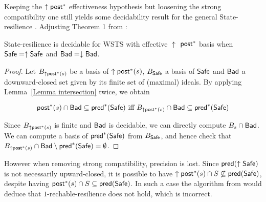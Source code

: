 Keeping the $\uparrow \textsf{post}^*$ effectiveness hypothesis but loosening the strong compatibility one still yields some decidability result for the general {\sc State-resilience }. Adjusting Theorem 1 from \cite{DBLP:journals/corr/abs-2108-00889}:


\begin{theorem}\label{post srp}
{\sc State-resilience} is decidable for 
 WSTS with effective 
$\uparrow$ $\textsf{post}^*$ basis
when
$\textsf{Safe}=\uparrow \textsf{Safe}$
and $\textsf{Bad}=\downarrow \textsf{Bad}$.
\end{theorem}


\begin{proof}
Let $B_{\uparrow \textsf{post}^*(s)}$ 
 be a basis of $\uparrow \textsf{post}^*(s)$, $B_{\textsf{Safe}}$ a basis of $\textsf{Safe}$
and $\textsf{Bad}$ a downward-closed set given by its finite set of (maximal) ideals.
By applying Lemma~\ref{Lemma intersection} twice, we obtain

\[ \textsf{post}^*(s) \cap \textsf{Bad} \subseteq \textsf{pred}^*(\textsf{Safe}) \text{ iff } B_{\uparrow \textsf{post}^*(s)} \cap \textsf{Bad} \subseteq \textsf{pred}^*(\textsf{Safe})\]

Since $B_{\uparrow \textsf{post}^*(s)}$ is finite and $\textsf{Bad}$ is decidable, we can directly compute $ B_s \cap \textsf{Bad}$.
We can compute a basis of $\textsf{pred}^*(\textsf{Safe})$ from $B_{\textsf{Safe}}$, and hence check that $B_{\uparrow \textsf{post}^*(s)} \cap \textsf{Bad} \setminus \textsf{pred}^*(\textsf{Safe}) = \emptyset$. 
\end{proof}

%
%



However when removing strong compatibility, precision is lost.
Since $\textsf{pred}(\uparrow \textsf{Safe})$ is not necessarily upward-closed, it is possible to have 
 $\uparrow \textsf{post}^* (s) \cap S \not\subseteq \textsf{pred}(\textsf{Safe})$,
despite having 
$\textsf{post}^* (s) \cap S \subseteq \textsf{pred}( \textsf{Safe})$.
In such a case the algorithm from
\cite{DBLP:conf/gg/Ozkan22} would deduce that $1$-rechable-resilience does not hold,
which is incorrect.

